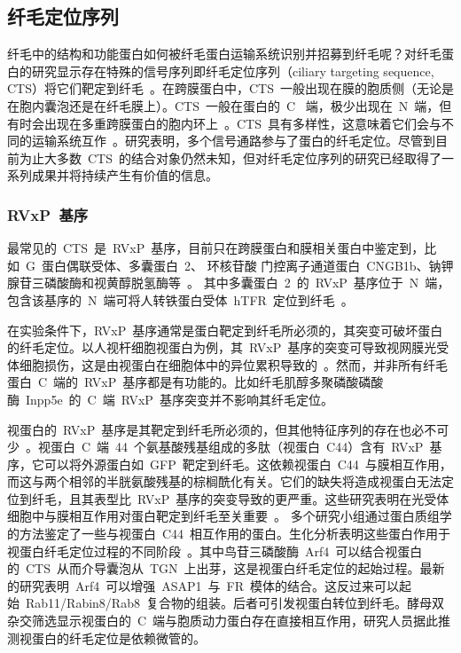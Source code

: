 \subsection{纤毛定位序列}
纤毛中的结构和功能蛋白如何被纤毛蛋白运输系统识别并招募到纤毛呢？对纤毛蛋白的研究显示存在特殊的信号序列即纤毛定位序列（ciliary targeting sequence, CTS）将它们靶定到纤毛\ \citep{Malicki2014}。在跨膜蛋白中，CTS\
一般出现在膜的胞质侧（无论是在胞内囊泡还是在纤毛膜上）\citep{Malicki2014}。CTS\ 一般在蛋白的\ C
\ 端，极少出现在\ N\
端，但有时会出现在多重跨膜蛋白的胞内环上\ \citep{Laird2015}。CTS\ 具有多样性，这意味着它们会与不同的运输系统互作\ \citep{Malicki2014}。研究表明，多个信号通路参与了蛋白的纤毛定位。尽管到目前为止大多数\ CTS\ 的结合对象仍然未知，但对纤毛定位序列的研究已经取得了一系列成果并将持续产生有价值的信息。

\subsubsection{RVxP\ 基序}
最常见的\ CTS\ 是\ RVxP\ 基序，目前只在跨膜蛋白和膜相关蛋白中鉴定到，比如\ G\ 蛋白偶联受体、多囊蛋白\ 2、 环核苷酸 门控离子通道蛋白\ CNGB1b、钠钾腺苷三磷酸酶和视黄醇脱氢酶等\
\citep{Laird2015,Geng2006,Jenkins2006,Michalakis2006}。 其中多囊蛋白\ 2\
的\ RVxP\
基序位于\ N\
端，包含该基序的\ N\
端可将人转铁蛋白受体\ hTFR\ 定位到纤毛\ \citep{Geng2006}。

在实验条件下，RVxP\ 基序通常是蛋白靶定到纤毛所必须的，其突变可破坏蛋白的纤毛定位。以人视杆细胞视蛋白为例，其\ RVxP\ 基序的突变可导致视网膜光受体细胞损伤，这是由视蛋白在细胞体中的异位累积导致的\ \citep{Tam2000}。然而，并非所有纤毛蛋白\ C\ 端的\ RVxP\ 基序都是有功能的。比如纤毛肌醇多聚磷酸磷酸酶\ Inpp5e\ 的\ C\ 端\ RVxP\ 基序突变并不影响其纤毛定位。

视蛋白的\ RVxP\ 基序是其靶定到纤毛所必须的，但其他特征序列的存在也必不可少\ \citep{Tam2000}。视蛋白\ C\ 端\ 44\ 个氨基酸残基组成的多肽（视蛋白\ C44）含有\ RVxP\ 基序，它可以将外源蛋白如\ GFP\ 靶定到纤毛。这依赖视蛋白\ C44\ 与膜相互作用，而这与两个相邻的半胱氨酸残基的棕榈酰化有关。它们的缺失将造成视蛋白无法定位到纤毛，且其表型比\ RVxP\ 基序的突变导致的更严重。这些研究表明在光受体细胞中与膜相互作用对蛋白靶定到纤毛至关重要\ \citep{Laird2015}。
多个研究小组通过蛋白质组学的方法鉴定了一些与视蛋白\ C44\ 相互作用的蛋白。生化分析表明这些蛋白作用于视蛋白纤毛定位过程的不同阶段\ \citep{Tam2000,Laird2015}。其中鸟苷三磷酸酶\ Arf4\ 可以结合视蛋白的\ CTS\ 从而介导囊泡从\ TGN\ 上出芽，这是视蛋白纤毛定位的起始过程。最新的研究表明\ Arf4\ 可以增强\ ASAP1\ 与\ FR\ 模体的结合。这反过来可以起始\ Rab11/Rabin8/Rab8\ 复合物的组装。后者可引发视蛋白转位到纤毛。酵母双杂交筛选显示视蛋白的\ C\ 端与胞质动力蛋白存在直接相互作用，研究人员据此推测视蛋白的纤毛定位是依赖微管的。

